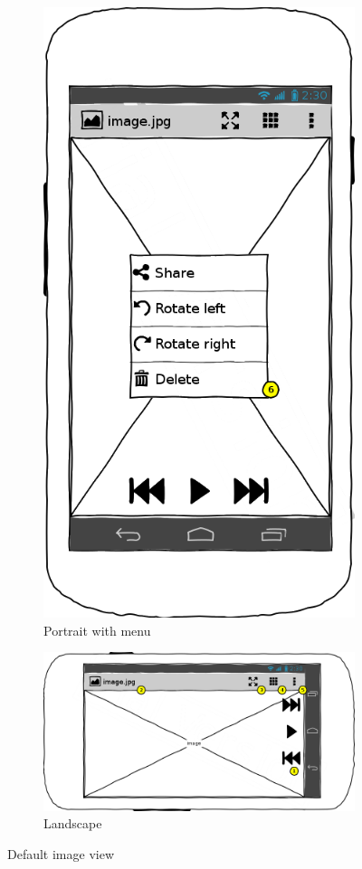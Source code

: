\documentclass[a4paper,11pt]{article}
\begin{document}
\begin{figure}[t]
\begin{subfigure}{0.5\textwidth}
		\includegraphics[scale=0.4]{default-portrait-menu}
		\caption{Portrait with menu}
		\label{dpm}
	\end{subfigure}
	
	\begin{subfigure}{\textwidth}
		\centering
		\includegraphics[scale=0.4]{default-landscape}
		\caption{Landscape}
		\label{dl}
	\end{subfigure}
	\caption{Default image view}
	\label{d}
\end{figure}
\end{document}
